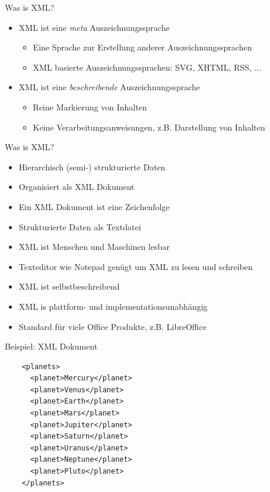 \documentclass{beamer}
\begin{document}
\begin{frame}{Was is XML?}
	
	\begin{itemize}
		\item XML ist eine \emph{meta} Auszeichnungssprache
		\begin{itemize}
			\item Eine Sprache zur Erstellung anderer Auszeichnungssprachen
			\item XML basierte Auszeichnungssprachen: SVG, XHTML, RSS, ...
		\end{itemize}
		\item XML ist eine \emph{beschreibende} Auszeichnungssprache
		\begin{itemize}
			\item Reine Markierung von Inhalten
			\item Keine Verarbeitungsanweisungen, z.B. Darstellung von Inhalten
		\end{itemize}
	\end{itemize}
	
\end{frame}

\begin{frame}{Was is XML?}
	
  \begin{itemize}
    \item Hierarchisch (semi-) strukturierte Daten
    \item Organisiert als XML Dokument
	\item Ein XML Dokument ist eine Zeichenfolge
	\item Strukturierte Daten als Textdatei
    \item XML ist Menschen und Maschinen lesbar
    \item Texteditor wie Notepad genügt um XML zu lesen und schreiben
    \item XML ist selbstbeschreibend
    \item XML is plattform- und implementationsunabhängig
    \item Standard für viele Office Produkte, z.B. LibreOffice
  \end{itemize}
	
\end{frame}

\lstset{language=XML}

\begin{frame}[fragile]{Beispiel: XML Dokument}
	\begin{lstlisting}
	<planets>
	  <planet>Mercury</planet>
	  <planet>Venus</planet>
	  <planet>Earth</planet>
	  <planet>Mars</planet>
	  <planet>Jupiter</planet>
	  <planet>Saturn</planet>
	  <planet>Uranus</planet>
	  <planet>Neptune</planet>
	  <planet>Pluto</planet>
	</planets>
	\end{lstlisting}	
\end{frame}
\end{document}

